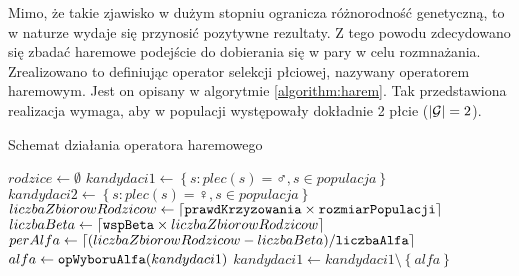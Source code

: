 \documentclass[./FM_mgr.tex]{subfiles}
\begin{document}
Mimo, że takie zjawisko w dużym stopniu ogranicza różnorodność genetyczną, to w naturze wydaje się przynosić pozytywne rezultaty.
Z tego powodu zdecydowano się zbadać haremowe podejście do dobierania się w pary w celu rozmnażania.
Zrealizowano to definiując operator selekcji płciowej, nazywany operatorem haremowym. Jest on opisany w algorytmie \ref{algorithm:harem}. 
Tak przedstawiona realizacja wymaga, aby w populacji występowały dokładnie 2 płcie ($|\mathcal{G}| = 2$).

\begin{algorithm}
	\caption{Schemat działania operatora haremowego \label{algorithm:harem}}
	\begin{algorithmic}[1]
		\Start
		\Var $rodzice \gets \emptyset$
		\label{line:harem_init_parents}
		\Var $kandydaci1 \gets \left\{ s: plec(s)=\male, s \in populacja \right\} $ 	
		\label{line:harem_init_candidates_begin}
		\Var $kandydaci2 \gets \left\{ s: plec(s)=\female, s \in populacja \right\} $
		\label{line:harem_init_candidates_end}
		\Var $liczbaZbiorowRodzicow \gets \lceil \mathtt{prawdKrzyzowania} \times \mathtt{rozmiarPopulacji} \rceil$
		\label{line:harem_init_out_size}
		\Var $liczbaBeta \gets \lceil \mathtt{wspBeta} \times liczbaZbiorowRodzicow \rceil$
		\label{line:harem_init_beta_count}
		\Var $perAlfa \gets \lceil (liczbaZbiorowRodzicow-liczbaBeta)/\mathtt{liczbaAlfa } \rceil$
		\label{line:harem_init_per_alfa}
		\label{line:harem_alfa_main_loop}
		\Var $alfa \gets \mathtt{opWyboruAlfa}(kandydaci1)$
		\label{line:harem_choose_alfa}
		\State $kandydaci1 \gets kandydaci1 \setminus \left\{ alfa \right\}$

\end{algorithmic}
\end{algorithm}
\end{document}
